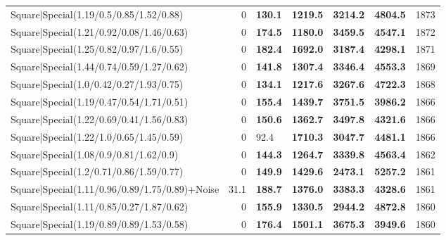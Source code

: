 \begin{tabular}{lrllllr}
 Square|Special(1.19/0.5/0.85/1.52/0.88)                       &             0   & \textbf{130.1} & \textbf{1219.5} & \textbf{3214.2} & \textbf{4804.5} &         1873 \\
 Square|Special(1.21/0.92/0.08/1.46/0.63)                      &             0   & \textbf{174.5} & \textbf{1180.0} & \textbf{3459.5} & \textbf{4547.1} &         1872 \\
 Square|Special(1.25/0.82/0.97/1.6/0.55)                       &             0   & \textbf{182.4} & \textbf{1692.0} & \textbf{3187.4} & \textbf{4298.1} &         1871 \\
 Square|Special(1.44/0.74/0.59/1.27/0.62)                      &             0   & \textbf{141.8} & \textbf{1307.4} & \textbf{3346.4} & \textbf{4553.3} &         1869 \\
 Square|Special(1.0/0.42/0.27/1.93/0.75)                       &             0   & \textbf{134.1} & \textbf{1217.6} & \textbf{3267.6} & \textbf{4722.3} &         1868 \\
 Square|Special(1.19/0.47/0.54/1.71/0.51)                      &             0   & \textbf{155.4} & \textbf{1439.7} & \textbf{3751.5} & \textbf{3986.2} &         1866 \\
 Square|Special(1.22/0.69/0.41/1.56/0.83)                      &             0   & \textbf{150.6} & \textbf{1362.7} & \textbf{3497.8} & \textbf{4321.6} &         1866 \\
 Square|Special(1.22/1.0/0.65/1.45/0.59)                       &             0   & 92.4           & \textbf{1710.3} & \textbf{3047.7} & \textbf{4481.1} &         1866 \\
 Square|Special(1.08/0.9/0.81/1.62/0.9)                        &             0   & \textbf{144.3} & \textbf{1264.7} & \textbf{3339.8} & \textbf{4563.4} &         1862 \\
 Square|Special(1.2/0.71/0.86/1.59/0.77)                       &             0   & \textbf{149.9} & \textbf{1429.6} & \textbf{2473.1} & \textbf{5257.2} &         1861 \\
 Square|Special(1.11/0.96/0.89/1.75/0.89)+Noise                &            31.1 & \textbf{188.7} & \textbf{1376.0} & \textbf{3383.3} & \textbf{4328.6} &         1861 \\
 Square|Special(1.11/0.85/0.27/1.87/0.62)                      &             0   & \textbf{155.9} & \textbf{1330.5} & \textbf{2944.2} & \textbf{4872.8} &         1860 \\
 Square|Special(1.19/0.89/0.89/1.53/0.58)                      &             0   & \textbf{176.4} & \textbf{1501.1} & \textbf{3675.3} & \textbf{3949.6} &         1860 \\

\end{tabular}
